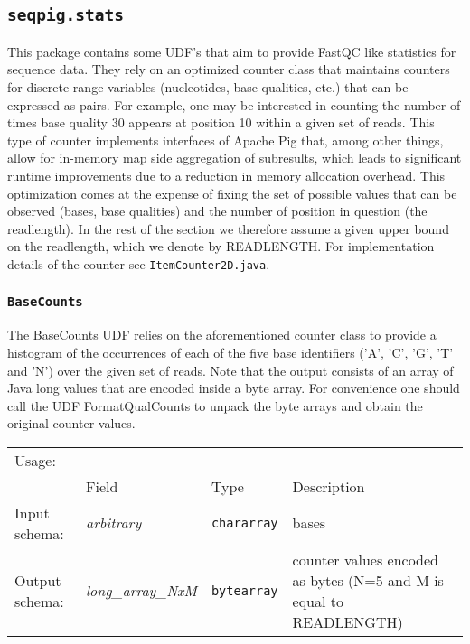 
\subsection{\texttt{seqpig.stats}}

This package contains some UDF's that aim to provide FastQC like
statistics for sequence data. They rely on an optimized counter class
that maintains counters for discrete range variables (nucleotides,
base qualities, etc.) that can be expressed as pairs. For example, one
may be interested in counting the number of times base quality 30
appears at position 10 within a given set of reads.  This type of
counter implements interfaces of Apache Pig that, among other things,
allow for in-memory map side aggregation of subresults, which leads to
significant runtime improvements due to a reduction in memory
allocation overhead. This optimization comes at the expense of fixing
the set of possible values that can be observed (bases, base
qualities) and the number of position in question (the readlength). In
the rest of the section we therefore assume a given upper bound on the
readlength, which we denote by READLENGTH. For implementation details
of the counter see \texttt{ItemCounter2D.java}.

\subsubsection{\texttt{BaseCounts}}

The BaseCounts UDF relies on the aforementioned counter class to
provide a histogram of the occurrences of each of the five base
identifiers ('A', 'C', 'G', 'T' and 'N') over the given set
of reads. Note that the output consists of an array of Java long
values that are encoded inside a byte array. For convenience one
should call the UDF FormatQualCounts to unpack the byte arrays
and obtain the original counter values.

\begin{tabular}{lp{}p{}p{}}
Usage: & \multicolumn{3}{l}{}
\hspace*{-0.55cm}\begin{minipage}{0.85\textwidth}
  \begin{lstlisting}
  reads = LOAD 'input.fq' USING FastqLoader();
  read_seqs = FOREACH reads GENERATE sequence;
  base_counts = FOREACH (GROUP read_seqs ALL) GENERATE BaseCounts($1);
  formatted_base_counts = FOREACH base_counts GENERATE FormatBaseCounts($0);
\end{lstlisting}
  \end{minipage}\hfill\kern-\arrayrulewidth
 \\[0.25cm]
& Field & Type & Description\\[0.1cm]
Input schema: & \emph{arbitrary} & \texttt{chararray} & bases\\
Output schema: & \emph{long\_array\_NxM} & \texttt{bytearray} & counter values encoded as bytes (N=5 and M is equal to READLENGTH)
\end{tabular}

